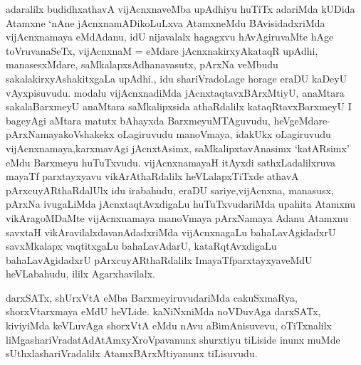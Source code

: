 \begin{artha}
adaralilx budidhxathavA vijAcnxnaveMba upAdhiyu huTiTx adariMda kUDida Atamxne `nAne jAcnxnamADikoLuLxva AtamxneMdu BAvisidadxriMda vijAcnxnamaya eMdAdanu, idU nijavalalx hagagxvu hAvAgiruvaMte hAge toVruvanaSeTx, vijAcnxnaM = eMdare jAcnxnakirxyAkataqR upAdhi, manasesxMdare, saMkalapxsAdhanavasutx, pArxNa veMbudu sakalakirxyAshakitxgaLa upAdhi., idu shariVradoLage horage eraDU kaDeyU vAyxpisuvudu. modalu vijAcnxnadiMda jAcnxtaqtavxBArxMtiyU, anaMtara sakalaBarxmeyU anaMtara saMkalipxsida athaRdalilx kataqRtavxBarxmeyU I bageyAgi aMtara matutx bAhayxda BarxmeyuMTAguvudu, heVgeMdare-pArxNamayakoVshakekx oLagiruvudu manoVmaya, idakUkx oLagiruvudu vijAcnxnamaya,karxmavAgi jAcnxtAsimx, saMkalipxtavAnasimx `katARsimx' eMdu Barxmeyu huTuTxvudu. vijAcnxnamayaH itAyxdi sathxLadalilxruva mayaTf parxtayxyavu vikArAthaRdalilx heVLalapxTiTxde athavA pArxcuyARthaRdalUlx idu irabahudu, eraDU sariye,vijAcnxna, manasusx, pArxNa ivugaLiMda jAcnxtaqtAvxdigaLu huTuTxvudariMda upahita Atamxnu vikAragoMDaMte vijAcnxnamaya manoVmaya pArxNamaya Adanu Atamxnu savxtaH vikAravilalxdavanAdadxriMda vijAcnxnagaLu bahaLavAgidadxrU savxMkalapx vaqtitxgaLu bahaLavAdarU, kataRqtAvxdigaLu bahaLavAgidadxrU pArxcuyARthaRdalilx ImayaTfparxtayxyaveMdU heVLabahudu, ililx Agarxhavilalx.

darxSATx, shUrxVtA eMba BarxmeyiruvudariMda cakuSxmaRya, shorxVtarxmaya eMdU heVLide. kaNiNxniMda noVDuvAga darxSATx, kiviyiMda keVLuvAga shorxVtA eMdu nAvu aBimAnisuvevu, oTiTxnalilx liMgashariVradatAdAtAmxyXroVpavanunx shurxtiyu tiLiside inunx muMde sUthxlashariVradalilx AtamxBArxMtiyanunx tiLisuvudu.
\end{artha}

